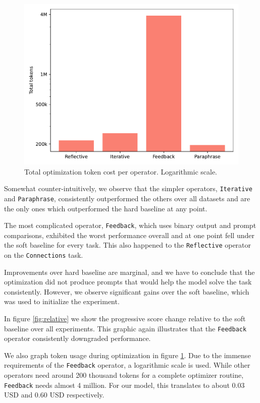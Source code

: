 \begin{figure}
    \includegraphics[width=\linewidth]{usage.pdf}
    \caption{Total optimization token cost per operator. Logarithmic scale.}
    \label{fig:usage}
\end{figure}

Somewhat counter-intuitively, we observe that the simpler operators, \texttt{Iterative} and \texttt{Paraphrase},
consistently outperformed the others over all datasets and are the only ones which outperformed the hard baseline at any point.

The most complicated operator, \texttt{Feedback}, which uses binary output and prompt comparisons, exhibited the
worst performance overall and at one point fell under the soft baseline for every task. This also happened to the
\texttt{Reflective} operator on the \texttt{Connections} task.

Improvements over hard baseline are marginal, and we have to conclude that the optimization did not produce 
prompts that would help the model solve the task consistently. However, we observe significant gains 
over the soft baseline, which was used to initialize the experiment.

In figure \ref{fig:relative} we show the progressive score change relative to the soft baseline
over all experiments. This graphic again illustrates that the \texttt{Feedback} operator consistently downgraded performance.

We also graph token usage during optimization in figure \ref{fig:usage}. Due to the immense requirements of
the \texttt{Feedback} operator, a logarithmic scale is used. While other operators need around 200 thousand tokens for a complete optimizer routine,
\texttt{Feedback} needs almost 4 million. For our model, this translates to about 0.03 USD and 0.60 USD respectively.



